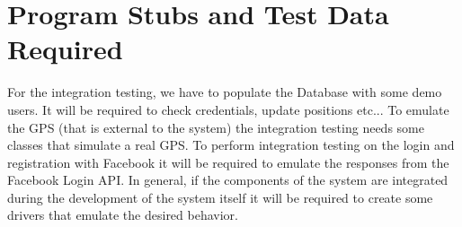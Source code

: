 \documentclass[../../testPlan.tex]{subfiles}
\begin{document}
	\chapter{Program Stubs and Test Data Required}

		For the integration testing, we have to populate the Database with some demo users. It will be required to check credentials, update positions etc...
		To emulate the GPS (that is external to the system) the integration testing needs some classes that simulate a real GPS.
		To perform integration testing on the login and registration with Facebook it will be required to emulate the responses from the Facebook Login API.
		In general, if the components of the system are integrated during the development of the system itself it will be required to create some drivers that emulate the desired behavior.
\end{document}
